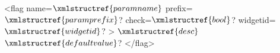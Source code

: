 <flag name=$\xmlstructref{paramname}$
  prefix=$\xmlstructref{paramprefix}$? check=$\xmlstructref{bool}$? widgetid=$\xmlstructref{widgetid}$? >
  $\xmlstructref{desc}$
  $\xmlstructref{defaultvalue}$?
</flag>
